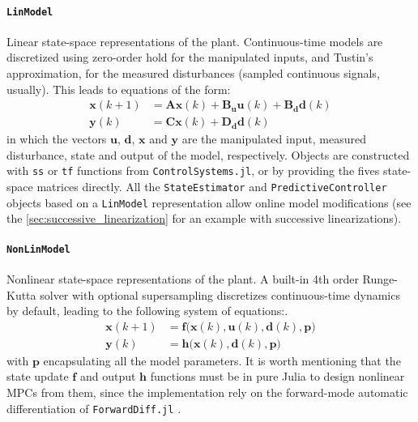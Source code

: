 \paragraph{\texttt{LinModel}}
Linear state-space representations of the plant. Continuous-time models are discretized using zero-order hold for the manipulated inputs, and Tustin's approximation, for the measured disturbances (sampled continuous signals, usually). This leads to equations of the form:
\begin{subequations}
\begin{align}
    \mathbf{x}(k+1) &= \mathbf{A x}(k) + \mathbf{B_u u}(k) + \mathbf{B_d d}(k) \\
    \mathbf{y}(k)   &= \mathbf{C x}(k) + \mathbf{D_d d}(k)
\end{align}
\end{subequations}
in which the vectors $\mathbf{u}$, $\mathbf{d}$, $\mathbf{x}$ and $\mathbf{y}$ are the manipulated input, measured disturbance, state and output of the model, respectively. Objects are constructed with \texttt{ss} or \texttt{tf} functions from \texttt{ControlSystems.jl}, or by providing the fives state-space matrices directly. All the \texttt{StateEstimator} and \texttt{PredictiveController} objects based on a \texttt{LinModel} representation allow online model modifications (see the \cref{sec:successive_linearization} for an example with successive linearizations).

\paragraph{\texttt{NonLinModel}}
Nonlinear state-space representations of the plant. A built-in 4th order Runge-Kutta solver with optional supersampling discretizes continuous-time dynamics by default, leading to the following system of equations:. 
\begin{subequations}
\begin{align}
    \mathbf{x}(k+1) &= \mathbf{f}\big(\mathbf{x}(k), \mathbf{u}(k), \mathbf{d}(k), \mathbf{p} \big) \\
    \mathbf{y}(k)   &= \mathbf{h}\big( \mathbf{x}(k), \mathbf{d}(k), \mathbf{p} \big)
\end{align}
\end{subequations}
with $\mathbf{p}$ encapsulating all the model parameters. It is worth mentioning that the state update $\mathbf{f}$ and output $\mathbf{h}$ functions must be in pure Julia to design nonlinear MPCs from them, since the implementation rely on the forward-mode automatic differentiation of \texttt{ForwardDiff.jl} \citep{forwardDiff}.

